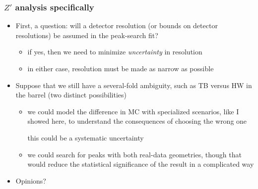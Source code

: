 \documentclass[compress]{beamer}
\begin{document}
\begin{frame}
\frametitle{$Z'$ analysis specifically}
\begin{itemize}
\item First, a question: will a detector resolution (or bounds on
  detector resolutions) be assumed in the peak-search fit?
\begin{itemize}
\item if yes, then we need to minimize {\it uncertainty} in resolution
\item in either case, resolution must be made as narrow as possible
\end{itemize}

\item Suppose that we still have a several-fold ambiguity, such as TB
  versus HW in the barrel (two distinct possibilities)
\begin{itemize}
\item we could model the difference in MC with specialized scenarios,
  like I showed here, to understand the consequences of choosing the
  wrong one

\vspace{0.2 cm}
this could be a systematic uncertainty

\vspace{0.2 cm}
\item we could search for peaks with both real-data geometries, though
  that would reduce the statistical significance of the result in a
  complicated way
\end{itemize}

\item Opinions?
\end{itemize}
\end{frame}


\end{document}
